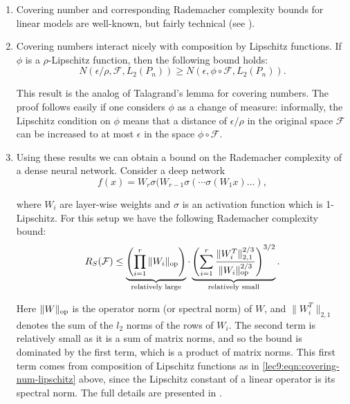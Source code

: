 \begin{enumerate}
\item Covering number and corresponding Rademacher complexity bounds for linear models are well-known, but fairly technical (see \cite{zhang2002}).
    
\item Covering numbers interact nicely with composition by Lipschitz functions. If $\phi$ is a $\rho$-Lipschitz function, then the following bound holds:
\begin{equation}\label{lec9:eqn:covering-num-lipschitz}
N(\epsilon/\rho, \mathcal{F}, L_2({P_n}))\geq N(\epsilon, \phi\circ\mathcal{F}, L_2({P_n})).
\end{equation}
    
This result is the analog of Talagrand's lemma for covering numbers. The proof follows easily if one considers $\phi$ as a change of measure: informally, the Lipschitz condition on $\phi$ means that a distance of $\epsilon/\rho$ in the original space $\mathcal{F}$ can be increased to at most $\epsilon$ in the space $\phi \circ \mathcal{F}$.

\item Using these results we can obtain a bound on the Rademacher complexity of a dense neural network. Consider a deep network
\begin{equation}
f(x) = W_r\sigma(W_{r-1}\sigma(\cdots \sigma(W_1x)\ldots),
\end{equation}

where $W_i$ are layer-wise weights and $\sigma$ is an activation function which is 1-Lipschitz. For this setup we have the following Rademacher complexity bound:
\begin{equation}
R_S (\mathcal F) \leq \underbrace{\left(\prod_{i=1}^r\|W_i\|_{\textup{op}} \right)}_{\text{relatively large}} \cdot \underbrace{\left( \sum_{i=1}^r\frac{\|W_i^T\|^{2/3}_{2,1}}{\|W_i\|_{\textup{op}}^{2/3}}\right)^{3/2}}_{\text{relatively small}}.
\end{equation}
        
Here $\|W\|_{\textup{op}}$ is the operator norm (or spectral norm) of $W$, and $\|W_i^T\|_{2,1}$ denotes the sum of the $l_2$ norms of the rows of $W_i$. The second term is relatively small as it is a sum of matrix norms, and so the bound is dominated by the first term, which is a product of matrix norms. This first term comes from composition of Lipschitz functions as in \eqref{lec9:eqn:covering-num-lipschitz} above, since the Lipschitz constant of a linear operator is its spectral norm. The full details are presented in \cite{bartlett2017}.
\end{enumerate}


